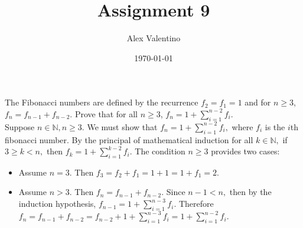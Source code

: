 \documentclass[12pt, letterpaper]{article}
\date{\today}
\author{Alex Valentino}
\title{Assignment 9}
\newcommand{\N}{\mathbb{N}}
\begin{document}
The Fibonacci numbers are defined by the recurrence $f_2=f_1=1$ and for $n \geq 3$, $f_n=f_{n-1}+f_{n-2}$.  Prove that for all $n \geq 3$, $f_n=1+\sum_{i=1}^{n-2}f_{i}$.\\
Suppose $n \in \N, n \geq 3.$  We must show that $f_n=1+\sum_{i=1}^{n-2}f_{i},$ where $f_i$ is the $i$th fibonacci number.  By the principal of mathematical induction for all $k \in \N,$ if $3 \geq k < n,$ then $f_k=1+\sum_{i=1}^{k-2}f_{i}$.  The condition $n \geq 3$ provides two cases:
\begin{itemize}
	\item Assume $n=3.$  Then $f_3 = f_2 + f_1 = 1 +1 = 1 + f_1 = 2.$
	\item Assume $n > 3.$  Then $f_n = f_{n-1} + f_{n-2}.$  Since $n-1<n,$ then by the induction hypothesis, $f_{n-1} = 1 + \sum_{i=1}^{n-3}f_i.$  Therefore $f_n = f_{n-1} + f_{n-2} =f_{n-2} + 1 + \sum_{i=1}^{n-3}f_i = 1 + \sum_{i=1}^{n-2}f_i.$
\end{itemize}
\end{document}
